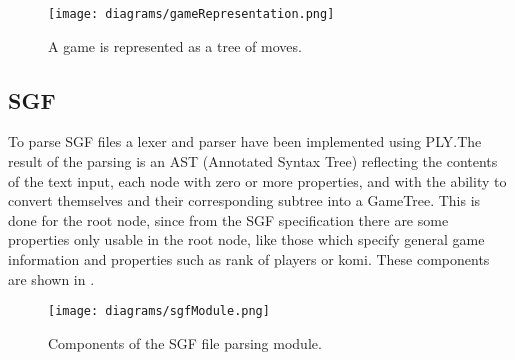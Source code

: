 \begin{figure}[h]
	\begin{center}
		\texttt{[image: diagrams/gameRepresentation.png]}
		\caption{A game is represented as a tree of moves.}\label{fig:gameRepresentation}
	\end{center}
\end{figure}

\subsection{SGF}

To parse SGF files a lexer and parser have been implemented using PLY.\@ The
result of the parsing is an AST (Annotated Syntax Tree) reflecting the contents
of the text input, each node with zero or more properties, and with the ability
to convert themselves and their corresponding subtree into a GameTree. This is
done for the root node, since from the SGF specification there are some
properties only usable in the root node, like those which specify general game
information and properties such as rank of players or komi. These components are
shown in .

\begin{figure}[h]
	\begin{center}
		\texttt{[image: diagrams/sgfModule.png]}
		\caption{Components of the SGF file parsing module.}\label{fig:sgfModule}
	\end{center}
\end{figure}
